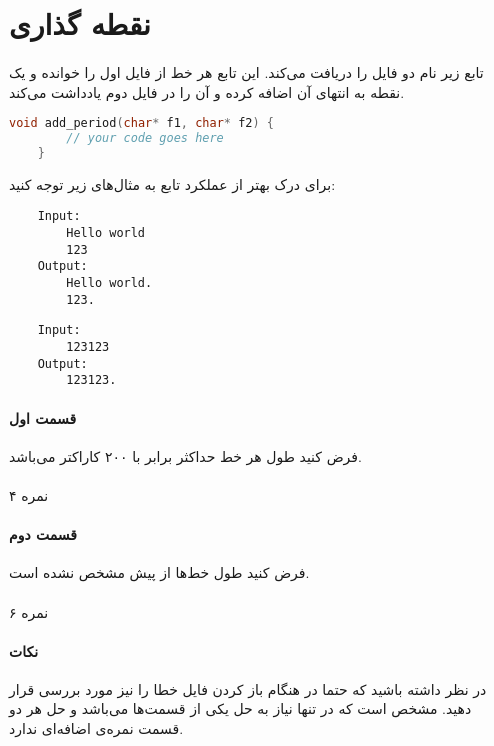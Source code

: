 \documentclass[../main.tex]{subfiles}
\begin{document}
\section{نقطه گذاری}
\paragraph{}
تابع زیر نام دو فایل را دریافت می‌کند.
این تابع هر خط از فایل اول را خوانده و یک نقطه
به انتهای آن اضافه کرده و آن را در فایل دوم یادداشت می‌کند.

\begin{latin}
\begin{lstlisting}[language=c]
    void add_period(char* f1, char* f2) {
        // your code goes here
    }
\end{lstlisting}
\end{latin}

برای درک بهتر از عملکرد تابع به مثال‌های زیر توجه کنید:

\begin{latin}
\begin{verbatim}
    Input:
        Hello world
        123
    Output:
        Hello world.
        123.
\end{verbatim}

\begin{verbatim}
    Input:
        123123
    Output:
        123123.
\end{verbatim}
\end{latin}

\paragraph{قسمت اول}
فرض کنید طول هر خط حداکثر برابر با ۲۰۰ کاراکتر می‌باشد.

\paragraph{}
۴ نمره

\paragraph{قسمت دوم}
فرض کنید طول خط‌ها از پیش مشخص نشده است.

\paragraph{}
۶ نمره

\paragraph{نکات}
در نظر داشته باشید که حتما در هنگام باز کردن فایل خطا را نیز مورد بررسی قرار دهید.
مشخص است که در تنها نیاز به حل یکی از قسمت‌ها می‌باشد و حل هر دو قسمت نمره‌ی اضافه‌ای ندارد.
\end{document}
